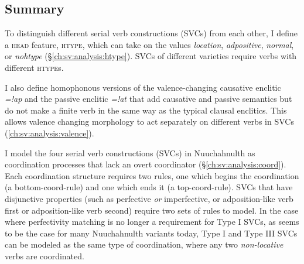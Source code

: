 \subsection{Summary}

To distinguish different serial verb constructions (SVCs) from each other, I define a \textsc{head} feature, \textsc{htype}, which can take on the values \textit{location}, \textit{adpositive}, \textit{normal}, or \textit{nohtype} (\S\ref{ch:sv:analysis:htype}). SVCs of different varieties require verbs with different \textsc{htype}s.

I also define homophonous versions of the valence-changing causative enclitic \textit{=!ap} and the passive enclitic \textit{=!at} that add causative and passive semantics but do not make a finite verb in the same way as the typical clausal enclitics. This allows valence changing morphology to act separately on different verbs in SVCs (\ref{ch:sv:analysis:valence}).

I model the four serial verb constructions (SVCs) in Nuuchahnulth as coordination processes that lack an overt coordinator (\S\ref{ch:sv:analysis:coord}). Each coordination structure requires two rules, one which begins the coordination (a bottom-coord-rule) and one which ends it (a top-coord-rule). SVCs that have disjunctive properties (such as perfective \textit{or} imperfective, or adposition-like verb first or adposition-like verb second) require two sets of rules to model. In the case where perfectivity matching is no longer a requirement for Type I SVCs, as seems to be the case for many Nuuchahnulth variants today, Type I and Type III SVCs can be modeled as the same type of coordination, where any two \textit{non-locative} verbs are coordinated.